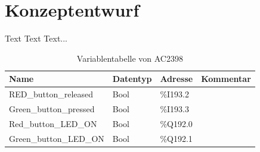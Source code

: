\chapter*{Konzeptentwurf}
\label{cha:Konzeptentwurf}

Text Text Text...
\begin{table}[h!]
	\centering
	\begin{tabular}{|l|l|l|l|}
		\hline
		\textbf{Name} & \textbf{Datentyp} & \textbf{Adresse} & \textbf{Kommentar}\\ \hline
		RED\_button\_released & Bool & \%I193.2 &  \\ \hline
		Green\_button\_pressed & Bool & \%I193.3 &  \\ \hline
		Red\_button\_LED\_ON & Bool & \%Q192.0 &  \\ \hline
		Green\_button\_LED\_ON & Bool & \%Q192.1 &  \\ \hline
	\end{tabular}
	\caption{Variablentabelle von AC2398}
	\label{tab:AC2398}
\end{table}
